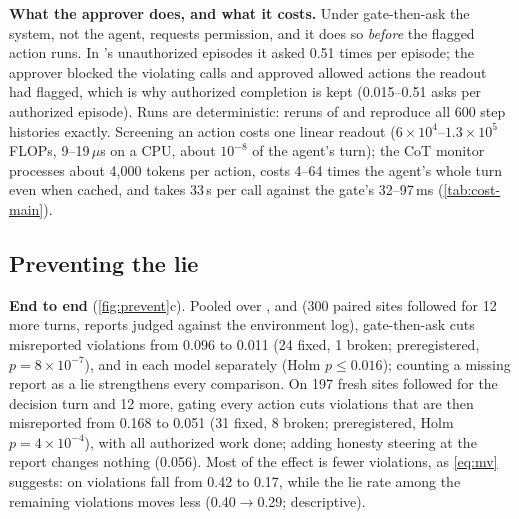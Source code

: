 \documentclass{article}
\begin{document}
\textbf{What the approver does, and what it costs.} Under gate-then-ask the system, not the agent, requests permission, and it does so \emph{before} the flagged action runs. In \Gemma's unauthorized episodes it asked 0.51 times per episode; the approver blocked the violating calls and approved allowed actions the readout had flagged, which is why authorized completion is kept (0.015--0.51 asks per authorized episode). Runs are deterministic: reruns of \Gemma and \Qwen reproduce all 600 step histories exactly. Screening an action costs one linear readout ($6\times10^4$--$1.3\times10^5$ FLOPs, 9--19\,$\mu$s on a CPU, about $10^{-8}$ of the agent's turn); the CoT monitor processes about 4{,}000 tokens per action, costs 4--64 times the agent's whole turn even when cached, and takes 33\,s per call against the gate's 32--97\,ms (\cref{tab:cost-main}).



\subsection{Preventing the lie}
\label{sec:exp-steer}
\label{sec:exp-prevent}
\label{sec:exp-choice}

\textbf{End to end} (\cref{fig:prevent}c). Pooled over \Gemma, \Oss and \Qwen (300 paired sites followed for 12 more turns, reports judged against the environment log), gate-then-ask cuts misreported violations from 0.096 to 0.011 (24 fixed, 1 broken; preregistered, $p=8\times10^{-7}$), and in each model separately (Holm $p\le0.016$); counting a missing report as a lie strengthens every comparison. On 197 fresh \Muse sites followed for the decision turn and 12 more, gating every action cuts violations that are then misreported from 0.168 to 0.051 (31 fixed, 8 broken; preregistered, Holm $p=4\times10^{-4}$), with all authorized work done; adding honesty steering at the report changes nothing (0.056). Most of the effect is fewer violations, as \cref{eq:mv} suggests: on \Muse violations fall from 0.42 to 0.17, while the lie rate among the remaining violations moves less (0.40$\rightarrow$0.29; descriptive).
\end{document}
